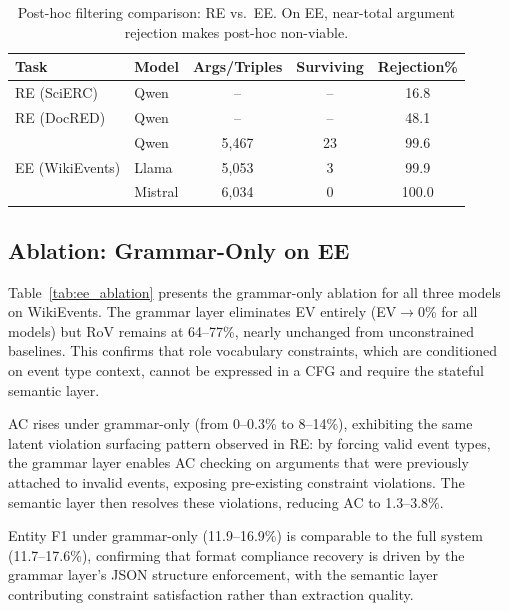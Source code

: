 \documentclass[11pt,a4paper]{article}
\begin{document}
\begin{table}[t]
\centering
\small
\caption{Post-hoc filtering comparison: RE vs.\ EE. On EE, near-total argument rejection makes post-hoc non-viable.}
\label{tab:posthoc_ee}
\begin{tabular}{llccc}
\toprule
Task & Model & Args/Triples & Surviving & Rejection\% \\
\midrule
RE (SciERC) & Qwen & -- & -- & 16.8 \\
RE (DocRED) & Qwen & -- & -- & 48.1 \\
\midrule
\multirow{3}{*}{EE (WikiEvents)} & Qwen & 5{,}467 & 23 & 99.6 \\
& Llama & 5{,}053 & 3 & 99.9 \\
& Mistral & 6{,}034 & 0 & 100.0 \\
\bottomrule
\end{tabular}
\end{table}

\subsection{Ablation: Grammar-Only on EE}
\label{sec:ablation_ee}

Table~\ref{tab:ee_ablation} presents the grammar-only ablation for all three models on WikiEvents. The grammar layer eliminates EV entirely (EV$\to$0\% for all models) but RoV remains at 64--77\%, nearly unchanged from unconstrained baselines. This confirms that role vocabulary constraints, which are conditioned on event type context, cannot be expressed in a CFG and require the stateful semantic layer.

AC rises under grammar-only (from 0--0.3\% to 8--14\%), exhibiting the same latent violation surfacing pattern observed in RE: by forcing valid event types, the grammar layer enables AC checking on arguments that were previously attached to invalid events, exposing pre-existing constraint violations. The semantic layer then resolves these violations, reducing AC to 1.3--3.8\%.

Entity F1 under grammar-only (11.9--16.9\%) is comparable to the full system (11.7--17.6\%), confirming that format compliance recovery is driven by the grammar layer's JSON structure enforcement, with the semantic layer contributing constraint satisfaction rather than extraction quality.
\end{document}
